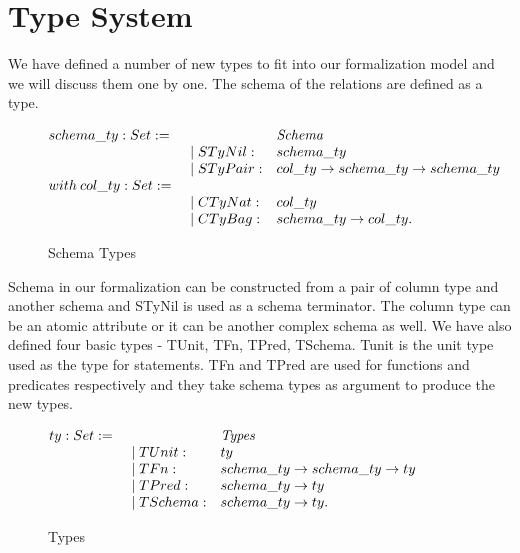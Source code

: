 \section{Type System}
\label{sec:types}

We have defined a number of new types to fit into our formalization model and we will discuss them one by one. The schema of the relations are defined as a type.
\begin{figure}
\begin{center}
$\begin{array}{@{}l@{~}l@{\quad}l@{\!\!\!\!\!\!}r}
schema\_ty : Set := & \ \ \ \ \ & \emph{Schema} \\
& \quad \mid STyNil: & schema\_ty\\
& \quad \mid STyPair: & col\_ty \rightarrow schema\_ty \rightarrow schema\_ty\\
with \:col\_ty : Set := & & \\
& \quad \mid CTyNat: & col\_ty\\
& \quad \mid CTyBag: & schema\_ty \rightarrow col\_ty. \\
\end{array}
$
\end{center}
\caption{Schema Types}
\label{fig-schema_types}
\end{figure}
Schema in our formalization can be constructed from a pair of column type and another schema and STyNil is used as a schema terminator. The column type can be an atomic attribute or it can be another complex schema as well. We have also defined four basic types - TUnit, TFn, TPred, TSchema. Tunit is the unit type used as the type for statements. TFn and TPred are used for functions and predicates respectively and they take schema types as argument to produce the new types.

\begin{figure}
\begin{center}
$\begin{array}{@{}l@{~}l@{\quad}l@{\!\!\!\!\!\!}r}
ty : Set := & \ \ \ \ \ & \emph{Types} \\
& \quad \mid TUnit: & ty\\
& \quad \mid TFn: & schema\_ty \rightarrow schema\_ty \rightarrow ty\\
& \quad \mid TPred: & schema\_ty \rightarrow ty\\
& \quad \mid TSchema: & schema\_ty \rightarrow ty. \\
\end{array}
$
\end{center}
\caption{Types}
\label{fig-types}
\end{figure} 

